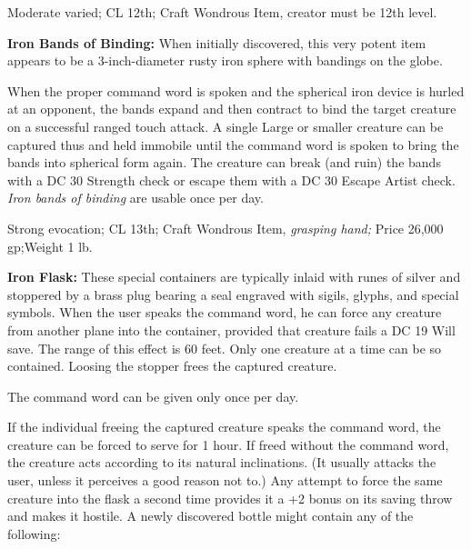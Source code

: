 \documentclass{article}
\begin{document}
Moderate varied; CL 12th; Craft Wondrous Item, creator must be 12th level.

\textbf{Iron Bands of Binding: }When initially discovered, this very potent item 
appears to be a 3-inch-diameter rusty iron sphere with bandings on the globe.

When the proper command word is spoken and the spherical iron device is hurled 
at an opponent, the bands expand and then contract to bind the target creature 
on a successful ranged touch attack. A single Large or smaller creature can be 
captured thus and held immobile until the command word is spoken to bring the bands 
into spherical form again. The creature can break (and ruin) the bands with a DC 
30 Strength check or escape them with a DC 30 Escape Artist check. \textit{Iron 
bands of binding }are usable once per day.

Strong evocation; CL 13th; Craft Wondrous Item, \textit{grasping hand; }Price 26,000 
gp;Weight 1 lb.

\textbf{Iron Flask:} These special containers are typically inlaid with runes of 
silver and stoppered by a brass plug bearing a seal engraved with sigils, glyphs, 
and special symbols. When the user speaks the command word, he can force any creature 
from another plane into the container, provided that creature fails a DC 19 Will 
save. The range of this effect is 60 feet. Only one creature at a time can be so 
contained. Loosing the stopper frees the captured creature. 

The command word can be given only once per day.

If the individual freeing the captured creature speaks the command word, the creature 
can be forced to serve for 1 hour. If freed without the command word, the creature 
acts according to its natural inclinations. (It usually attacks the user, unless 
it perceives a good reason not to.) Any attempt to force the same creature into 
the flask a second time provides it a +2 bonus on its saving throw and makes it 
hostile. A newly discovered bottle might contain any of the following:
\end{document}
